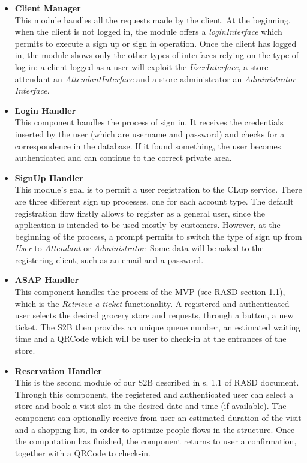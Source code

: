 \documentclass[table, 12pt]{article}
\begin{document}
\begin{itemize}
    \item \textbf{Client Manager}\\This module handles all the requests made by the client. At the beginning, when the client is not logged in, the module offers a \textit{loginInterface} which permits to execute a sign up or sign in operation. Once the client has logged in, the module shows only the other types of interfaces relying on the type of log in: a client logged as a user will exploit the \textit{UserInterface}, a store attendant an \textit{AttendantInterface} and a store administrator an \textit{Administrator Interface}.
    \item \textbf{Login Handler}\\This component handles the process of sign in. It receives the credentials inserted by the user (which are username and password) and checks for a correspondence in the database. If it found something, the user becomes authenticated and can continue to the correct private area.
    \item \textbf{SignUp Handler}\\This module's goal is to permit a user registration to the CLup service. There are three different sign up processes, one for each account type. The default registration flow firstly allows to register as a general user, since the application is intended to be used mostly by customers. However, at the beginning of the process, a prompt permits to switch the type of sign up from \textit{User} to \textit{Attendant} or \textit{Administrator}. Some data will be asked to the registering client, such as an email and a password.
    \item \textbf{ASAP Handler}\\This component handles the process of the MVP (see RASD section 1.1), which is the \textit{Retrieve a ticket} functionality. A registered and authenticated user selects the desired grocery store and requests, through a button, a new ticket. The S2B then provides an unique queue number, an estimated waiting time and a QRCode which will be user to check-in at the entrances of the store.
    \item \textbf{Reservation Handler}\\This is the second module of our S2B described in s. 1.1 of RASD document. Through this component, the registered and authenticated user can select a store and book a visit slot in the desired date and time (if available). The component can optionally receive from user an estimated duration of the visit and a shopping list, in order to optimize people flows in the structure. Once the computation has finished, the component returns to user a confirmation, together with a QRCode to check-in.

\end{itemize}
\end{document}
